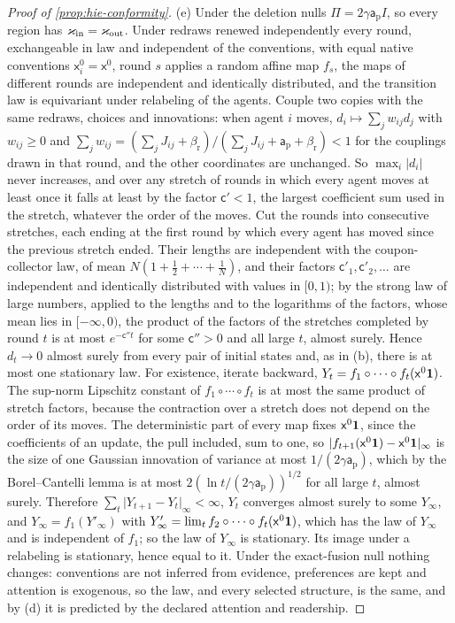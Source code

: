 \begin{proof}[Proof of \cref{prop:hie-conformity}]
(e) Under the deletion nulls $\Pi=2\gamma\mathsf a_{\mathrm p}I$, so every region has $\varkappa_{\mathrm{in}}=\varkappa_{\mathrm{out}}$. Under redraws renewed independently every round, exchangeable in law and independent of the conventions, with equal native conventions $\mathsf x^0_i=\mathsf x^0$, round $s$ applies a random affine map $f_s$, the maps of different rounds are independent and identically distributed, and the transition law is equivariant under relabeling of the agents. Couple two copies with the same redraws, choices and innovations: when agent $i$ moves, $d_i\mapsto\sum_jw_{ij}d_j$ with $w_{ij}\ge0$ and $\sum_jw_{ij}=(\sum_jJ_{ij}+\beta_{\mathrm r})/(\sum_jJ_{ij}+\mathsf a_{\mathrm p}+\beta_{\mathrm r})<1$ for the couplings drawn in that round, and the other coordinates are unchanged. So $\max_i\lvert d_i\rvert$ never increases, and over any stretch of rounds in which every agent moves at least once it falls at least by the factor $\mathsf c'<1$, the largest coefficient sum used in the stretch, whatever the order of the moves. Cut the rounds into consecutive stretches, each ending at the first round by which every agent has moved since the previous stretch ended. Their lengths are independent with the coupon-collector law, of mean $N(1+\frac12+\cdots+\frac1N)$, and their factors $\mathsf c'_1,\mathsf c'_2,\dots$ are independent and identically distributed with values in $[0,1)$; by the strong law of large numbers, applied to the lengths and to the logarithms of the factors, whose mean lies in $[-\infty,0)$, the product of the factors of the stretches completed by round $t$ is at most $e^{-\mathsf c''t}$ for some $\mathsf c''>0$ and all large $t$, almost surely. Hence $d_t\to0$ almost surely from every pair of initial states and, as in (b), there is at most one stationary law. For existence, iterate backward, $Y_t=f_1\circ\cdots\circ f_t(\mathsf x^0\mathbf{1})$. The sup-norm Lipschitz constant of $f_1\circ\cdots\circ f_t$ is at most the same product of stretch factors, because the contraction over a stretch does not depend on the order of its moves. The deterministic part of every map fixes $\mathsf x^0\mathbf{1}$, since the coefficients of an update, the pull included, sum to one, so $\lvert f_{t+1}(\mathsf x^0\mathbf{1})-\mathsf x^0\mathbf{1}\rvert_\infty$ is the size of one Gaussian innovation of variance at most $1/(2\gamma\mathsf a_{\mathrm p})$, which by the Borel--Cantelli lemma is at most $2(\ln t/(2\gamma\mathsf a_{\mathrm p}))^{1/2}$ for all large $t$, almost surely. Therefore $\sum_t\lvert Y_{t+1}-Y_t\rvert_\infty<\infty$, $Y_t$ converges almost surely to some $Y_\infty$, and $Y_\infty=f_1(Y'_\infty)$ with $Y'_\infty=\lim_tf_2\circ\cdots\circ f_t(\mathsf x^0\mathbf{1})$, which has the law of $Y_\infty$ and is independent of $f_1$; so the law of $Y_\infty$ is stationary. Its image under a relabeling is stationary, hence equal to it. Under the exact-fusion null nothing changes: conventions are not inferred from evidence, preferences are kept and attention is exogenous, so the law, and every selected structure, is the same, and by (d) it is predicted by the declared attention and readership.
\end{proof}

